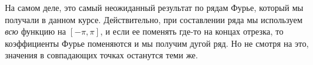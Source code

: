 На самом деле, это самый неожиданный результат по рядам Фурье, который мы получали в данном курсе. Действительно, при составлении ряда мы используем \textit{всю} функцию на $[-\pi, \pi]$, и если ее поменять где-то на концах отрезка, то коэффициенты Фурье поменяются и мы получим дугой ряд. Но не смотря на это, значения в совпадающих точках останутся теми же.